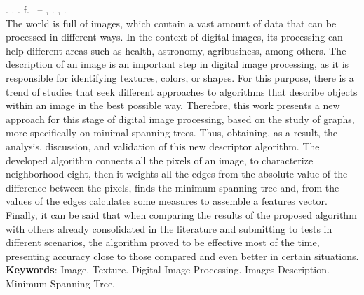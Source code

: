 
\begin{resumo}[ABSTRACT]
\begin{SingleSpacing}

\imprimirautorcitacao. \imprimirtitleabstract. \imprimirdata. \pageref {LastPage} f. \imprimirprojeto\ – \imprimirprograma, \imprimirinstituicao. \imprimirlocal, \imprimirdata.\\

The world is full of images, which contain a vast amount of data that can be processed in different ways. In the context of digital images, its processing can help different areas such as health, astronomy, agribusiness, among others. The description of an image is an important step in digital image processing, as it is responsible for identifying textures, colors, or shapes. For this purpose, there is a trend of studies that seek different approaches to algorithms that describe objects within an image in the best possible way. Therefore, this work presents a new approach for this stage of digital image processing, based on the study of graphs, more specifically on minimal spanning trees. Thus, obtaining, as a result, the analysis, discussion, and validation of this new descriptor algorithm. The developed algorithm connects all the pixels of an image, to characterize neighborhood eight, then it weights all the edges from the absolute value of the difference between the pixels, finds the minimum spanning tree and, from the values of the edges calculates some measures to assemble a features vector. Finally, it can be said that when comparing the results of the proposed algorithm with others already consolidated in the literature and submitting to tests in different scenarios, the algorithm proved to be effective most of the time, presenting accuracy close to those compared and even better in certain situations.
\\

\textbf{Keywords}: Image. Texture. Digital Image Processing. Images Description. Minimum Spanning Tree.

\end{SingleSpacing}
\end{resumo}

